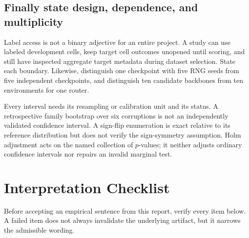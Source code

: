 \subsection{Finally state design, dependence, and multiplicity}
\label{fr:sec-interpret-design}

Label access is not a binary adjective for an entire project.  A study can use labeled development
cells, keep target cell outcomes unopened until scoring, and still have inspected aggregate target
metadata during dataset selection.  State each boundary.  Likewise, distinguish one checkpoint
with five RNG seeds from five independent checkpoints, and distinguish ten candidate backbones
from ten environments for one router.

Every interval needs its resampling or calibration unit and its status.  A retrospective family
bootstrap over six corruptions is not an independently validated confidence interval.  A sign-flip
enumeration is exact relative to its reference distribution but does not verify the sign-symmetry
assumption.  Holm adjustment acts on the named collection of $p$-values; it neither adjusts ordinary
confidence intervals nor repairs an invalid marginal test.

\section{Interpretation Checklist}
\label{fr:sec-interpretation-checklist}

Before accepting an empirical sentence from this report, verify every item below.  A failed item
does not always invalidate the underlying artifact, but it narrows the admissible wording.

